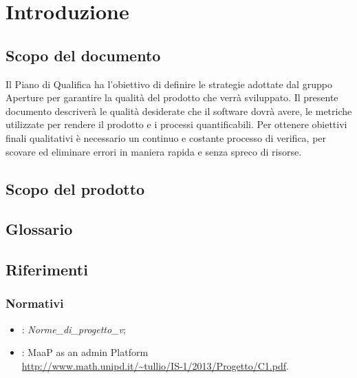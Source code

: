\newpage
\tableofcontents

\newpage
\listoftables
\listoffigures

\newpage
\section{Introduzione}%
\label{1.0}
\subsection{Scopo del documento}%
\label{1.1}
Il Piano di Qualifica ha l'obiettivo di definire le strategie adottate dal gruppo Aperture  per garantire la qualità del prodotto che verrà sviluppato.
Il presente documento descriverà le qualità desiderate che il software dovrà avere, le metriche utilizzate per rendere il prodotto e i processi quantificabili. Per ottenere obiettivi finali qualitativi è necessario un continuo e costante processo di verifica, per scovare ed eliminare errori in maniera rapida e senza spreco di risorse.

\subsection{Scopo del prodotto}%
\label{1.2}
\Prodotto{}

\subsection{Glossario}%
\label{1.3}
\Glossario{}

\subsection{Riferimenti} %
\label{1.4}
\subsubsection{Normativi}
\label{1.4.1}
\begin{itemize}
\item {}: \emph{Norme\_di\_progetto\_v\versioneNormeDiProgetto{}};\\
\item {}: MaaP as an admin Platform\\
\url{http://www.math.unipd.it/~tullio/IS-1/2013/Progetto/C1.pdf}.
\end{itemize}
